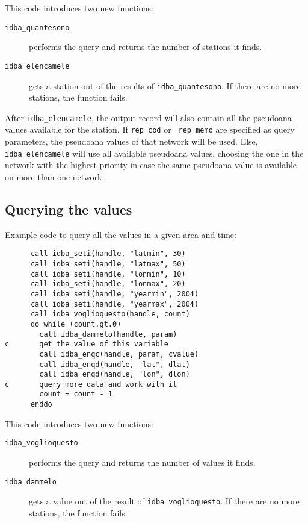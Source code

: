 \documentclass[final,12pt,a4paper,twoside]{book}
\begin{document}
This code introduces two new functions:

\begin{description}
\item[{\tt idba\_quantesono}]
  performs the query and returns the number of stations it finds.

\item[{\tt idba\_elencamele}]
  gets a station out of the results of {\tt idba\_quantesono}.  If there are no
  more stations, the function fails.
\end{description}

After {\tt idba\_elencamele}, the output record will also contain all the
pseudoana values available for the station.  If {\tt rep\_cod} or {\tt
rep\_memo} are specified as query parameters, the pseudoana values of that
network will be used.  Else, {\tt idba\_elencamele} will use all available
pseudoana values, choosing the one in the network with the highest priority in
case the same pseudoana value is available on more than one network.


\subsection {Querying the values}

Example code to query all the values in a given area and time:
\label{fun-idba_voglioquesto}
\label{fun-idba_dammelo}

\begin{verbatim}
      call idba_seti(handle, "latmin", 30)
      call idba_seti(handle, "latmax", 50)
      call idba_seti(handle, "lonmin", 10)
      call idba_seti(handle, "lonmax", 20)
      call idba_seti(handle, "yearmin", 2004)
      call idba_seti(handle, "yearmax", 2004)
      call idba_voglioquesto(handle, count)
      do while (count.gt.0)
        call idba_dammelo(handle, param)
c       get the value of this variable
        call idba_enqc(handle, param, cvalue)
        call idba_enqd(handle, "lat", dlat)
        call idba_enqd(handle, "lon", dlon)
c       query more data and work with it
        count = count - 1
      enddo
\end{verbatim}
   
This code introduces two new functions:

\begin{description}
\item[{\tt idba\_voglioquesto}]
  performs the query and returns the number of values it finds.
\item[{\tt idba\_dammelo}]
  gets a value out of the result of {\tt idba\_voglioquesto}.  If there are no
  more stations, the function fails.
\end{description}
\end{document}
